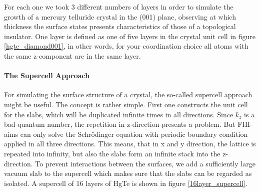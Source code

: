 		For each one we took 3 different numbers of layers in order to simulate the growth of a mercury telluride crystal in the (001) plane, observing at which thickness the surface states presents characteristics of those of a topological insulator. One layer is defined as one of five layers in the crystal unit cell in figure \ref{hgte_diamond001}, in other words, for your coordination choice all atoms with the same z-component are in the same layer.
		 
	\paragraph{The Supercell Approach}
		For simulating the surface structure of a crystal, the so-called supercell approach might be useful. The concept is rather simple. First one constructs the unit cell for the slabs, which will be duplicated infinite times in all directions. Since $k_z$ is a bad quantum number, the repetition in z-direction presents a problem. But FHI-aims can only solve the Schrödinger equation with periodic boundary condition applied in all three directions. This means, that in x and y direction, the lattice is repeated into infinity, but also the slabs form an infinite stack into the z-direction.
		To prevent interactions between the surfaces, we add a sufficiently large vacuum slab to the supercell which makes sure that the slabs can be regarded as isolated. 
		A supercell of 16 layers of HgTe is shown in figure \ref{16layer_supercell}.
	

